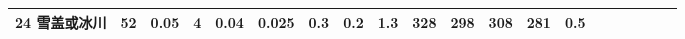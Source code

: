 \begin{sidewaystable}[]
\begin{tabular}{@{}lccccccccccccccccccc@{}}
    24 雪盖或冰川   & 52                                                                & 0.05                                                                                                   & 4                                                                                  & 0.04                                                                               & 0.025                                                               & 0.3                                                       & 0.2                                                       & 1.3                                                       & 328                                                             & 298                                                             & 308                                                              & 281                                                               & 0.5                                                          \\\bottomrule
    \end{tabular}
\end{sidewaystable}


